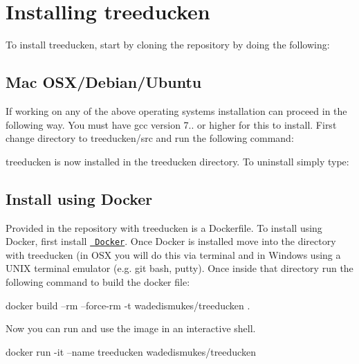 \section*{Installing treeducken}

To install treeducken, start by cloning the repository by doing the following\+:


\begin{DoxyCode}{0}
\end{DoxyCode}


\subsection*{Mac O\+S\+X/\+Debian/\+Ubuntu}

If working on any of the above operating systems installation can proceed in the following way. You must have gcc version 7.. or higher for this to install. First change directory to {\ttfamily treeducken/src} and run the following command\+:


\begin{DoxyCode}{0}
\end{DoxyCode}


treeducken is now installed in the {\ttfamily treeducken} directory. To uninstall simply type\+:


\begin{DoxyCode}{0}
\end{DoxyCode}
 \subsection*{Install using Docker}

Provided in the repository with treeducken is a Dockerfile. To install using Docker, first install \href{https://docs.docker.com/install/}{\texttt{ Docker}}. Once Docker is installed move into the directory with treeducken (in O\+SX you will do this via terminal and in Windows using a U\+N\+IX terminal emulator (e.\+g. git bash, putty). Once inside that directory run the following command to build the docker file\+: \begin{DoxyVerb}docker build --rm --force-rm -t wadedismukes/treeducken .
\end{DoxyVerb}


Now you can run and use the image in an interactive shell. \begin{DoxyVerb}docker run -it --name treeducken wadedismukes/treeducken 
\end{DoxyVerb}


